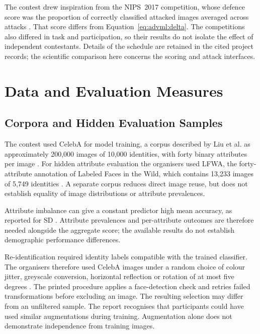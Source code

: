 The contest drew inspiration from the NIPS~2017 competition, whose defence score was the
proportion of correctly classified attacked images averaged across attacks
\cite{kurakin2018competition}. That score differs from Equation~\ref{eq:advml:delta}.
The competitions also differed in task and participation, so their results do not isolate
the effect of independent contestants. Details of the schedule are retained in the cited
project records; the scientific comparison here concerns the scoring and attack interfaces.

\section{Data and Evaluation Measures}
\label{sec:advml:5}

\subsection{Corpora and Hidden Evaluation Samples}

The contest used CelebA for model training, a corpus described by Liu et al. as approximately
200,000 images of 10,000 identities, with forty binary attributes per image
\cite{liu2015celeba}. For hidden attribute evaluation the organisers used LFWA, the
forty-attribute annotation of Labeled Faces in the Wild, which contains 13,233 images of
5,749 identities \cite{huang2007lfw, liu2015celeba}. A separate corpus reduces direct image
reuse, but does not establish equality of image distributions or attribute prevalences.

Attribute imbalance can give a constant predictor high mean accuracy, as reported for SD
\cite{sparta2022d76}. Attribute prevalences and per-attribute outcomes are therefore needed
alongside the aggregate score; the available results do not establish demographic performance
differences.

Re-identification required identity labels compatible with the trained classifier. The
organisers therefore used CelebA images under a random choice of colour jitter, greyscale
conversion, horizontal reflection or rotation of at most five degrees
\cite{sparta2022d76}. The printed procedure applies a face-detection check and retries failed
transformations before excluding an image. The resulting selection may differ from an
unfiltered sample. The report recognises that participants could have used similar
augmentations during training. Augmentation alone does not demonstrate independence from
training images.

